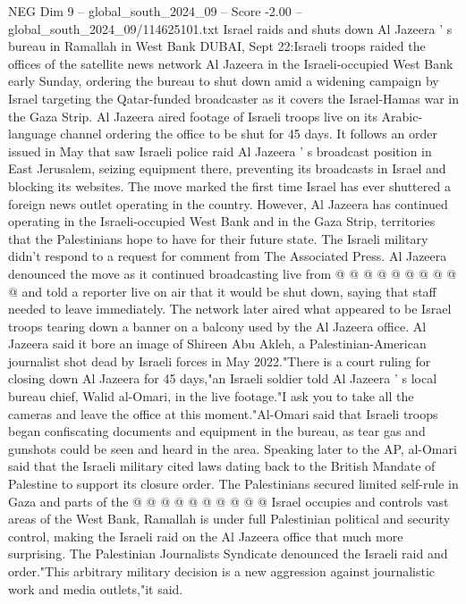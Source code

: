 \begin{textsample}{NEG Dim 9 – global\_south\_2024\_09 – Score -2.00 – global\_south\_2024\_09/114625101.txt}  \label{ex:f9_neg_204}
Israel raids and shuts down Al Jazeera ' s bureau in Ramallah in West Bank DUBAI, Sept 22:Israeli troops raided the offices of the satellite news network Al Jazeera in the Israeli-occupied West Bank early Sunday, ordering the bureau to shut down amid a widening campaign by Israel targeting the Qatar-funded broadcaster as it covers the Israel-Hamas war in the Gaza Strip.
Al Jazeera aired footage of Israeli troops live on its Arabic-language channel ordering the office to be shut for 45 days.
It follows an order issued in May that saw Israeli police raid Al Jazeera ' s broadcast position in East Jerusalem, seizing equipment there, preventing its broadcasts in Israel and blocking its websites.
The move marked the first time Israel has ever shuttered a foreign news outlet operating in the country.
However, Al Jazeera has continued operating in the Israeli-occupied West Bank and in the Gaza Strip, territories that the Palestinians hope to have for their future state.
The Israeli military didn't respond to a request for comment from The Associated Press.
Al Jazeera denounced the move as it continued broadcasting live from @ @ @ @ @ @ @ @ @ @ and told a reporter live on air that it would be shut down, saying that staff needed to leave immediately.
The network later aired what appeared to be Israel troops tearing down a banner on a balcony used by the Al Jazeera office.
Al Jazeera said it bore an image of Shireen Abu Akleh, a Palestinian-American journalist shot dead by Israeli forces in May 2022."There is a court ruling for closing down Al Jazeera for 45 days,"an Israeli soldier told Al Jazeera ' s local bureau chief, Walid al-Omari, in the live footage."I ask you to take all the cameras and leave the office at this moment."Al-Omari said that Israeli troops began confiscating documents and equipment in the bureau, as tear gas and gunshots could be seen and heard in the area.
Speaking later to the AP, al-Omari said that the Israeli military cited laws dating back to the British Mandate of Palestine to support its closure order.
The Palestinians secured limited self-rule in Gaza and parts of the @ @ @ @ @ @ @ @ @ @ Israel occupies and controls vast areas of the West Bank, Ramallah is under full Palestinian political and security control, making the Israeli raid on the Al Jazeera office that much more surprising.
The Palestinian Journalists Syndicate denounced the Israeli raid and order."This arbitrary military decision is a new aggression against journalistic work and media outlets,"it said.

\end{textsample}

